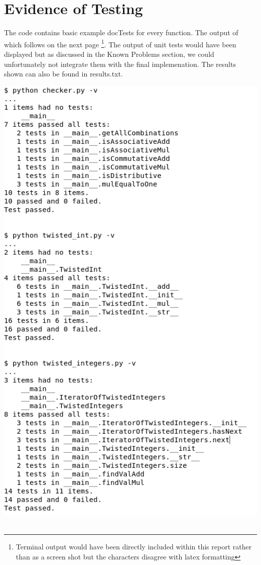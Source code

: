 \documentclass[11]{article}
\begin{document}
	\section{Evidence of Testing}	
		The code contains basic example docTests for every function. The output of which follows on the next page \footnote{Terminal output would have been directly included within this report rather than as a screen shot but the characters disagree with latex formatting}. The output of unit tests would have been displayed but as discussed in the Known Problems section, we could unfortunately not integrate them with the final implemenation. The results shown can also be found in results.txt. 
		\newpage
		
			\includegraphics[scale=0.5]{Test1.png} \\\\
\end{document}

